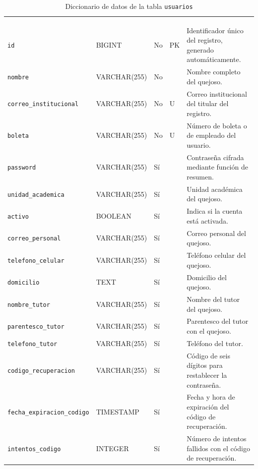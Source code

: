 \footnotesize
\renewcommand{\arraystretch}{1.15}
\setlength{\tabcolsep}{4pt}
\begin{longtable}{|L{3.9cm}|L{2.4cm}|L{0.9cm}|L{1.2cm}|L{6.6cm}|}
	\hiderowcolors\caption{Diccionario de datos de la tabla \texttt{usuarios}}
	\label{tab:dic_usuarios} \\ \showrowcolors
	\hline
	 &  &  &  &  \\
	\hline
	\endfirsthead
	\hline
	 &  &  &  &  \\
	\hline
	\endhead
		\texttt{id} & BIGINT & No & PK & Identificador único del registro, generado automáticamente. \\ \hline
		\texttt{nombre} & VARCHAR(255) & No &  & Nombre completo del quejoso. \\ \hline
		\texttt{correo\_\allowbreak{}institucional} & VARCHAR(255) & No & U & Correo institucional del titular del registro. \\ \hline
		\texttt{boleta} & VARCHAR(255) & No & U & Número de boleta o de empleado del usuario. \\ \hline
		\texttt{password} & VARCHAR(255) & Sí &  & Contraseña cifrada mediante función de resumen. \\ \hline
		\texttt{unidad\_\allowbreak{}academica} & VARCHAR(255) & Sí &  & Unidad académica del quejoso. \\ \hline
		\texttt{activo} & BOOLEAN & Sí &  & Indica si la cuenta está activada. \\ \hline
		\texttt{correo\_\allowbreak{}personal} & VARCHAR(255) & Sí &  & Correo personal del quejoso. \\ \hline
		\texttt{telefono\_\allowbreak{}celular} & VARCHAR(255) & Sí &  & Teléfono celular del quejoso. \\ \hline
		\texttt{domicilio} & TEXT & Sí &  & Domicilio del quejoso. \\ \hline
		\texttt{nombre\_\allowbreak{}tutor} & VARCHAR(255) & Sí &  & Nombre del tutor del quejoso. \\ \hline
		\texttt{parentesco\_\allowbreak{}tutor} & VARCHAR(255) & Sí &  & Parentesco del tutor con el quejoso. \\ \hline
		\texttt{telefono\_\allowbreak{}tutor} & VARCHAR(255) & Sí &  & Teléfono del tutor. \\ \hline
		\texttt{codigo\_\allowbreak{}recuperacion} & VARCHAR(255) & Sí &  & Código de seis dígitos para restablecer la contraseña. \\ \hline
		\texttt{fecha\_\allowbreak{}expiracion\_\allowbreak{}codigo} & TIMESTAMP & Sí &  & Fecha y hora de expiración del código de recuperación. \\ \hline
		\texttt{intentos\_\allowbreak{}codigo} & INTEGER & Sí &  & Número de intentos fallidos con el código de recuperación. \\ \hline
\end{longtable}
\normalsize
\setlength{\tabcolsep}{6pt}
\renewcommand{\arraystretch}{1}

